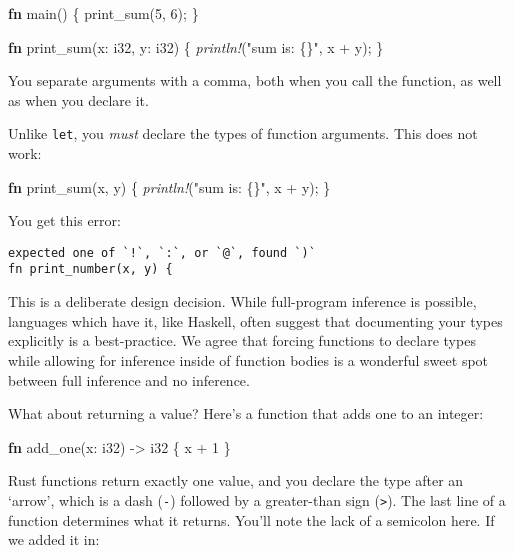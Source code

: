 \documentclass[a4paper,]{book}
\newenvironment{Shaded}{\begin{snugshade}}{\end{snugshade}}
\newcommand{\KeywordTok}[1]{\textcolor[rgb]{0.13,0.29,0.53}{\textbf{{#1}}}}
\newcommand{\DataTypeTok}[1]{\textcolor[rgb]{0.13,0.29,0.53}{{#1}}}
\newcommand{\DecValTok}[1]{\textcolor[rgb]{0.00,0.00,0.81}{{#1}}}
\newcommand{\StringTok}[1]{\textcolor[rgb]{0.31,0.60,0.02}{{#1}}}
\newcommand{\PreprocessorTok}[1]{\textcolor[rgb]{0.56,0.35,0.01}{\textit{{#1}}}}
\newcommand{\NormalTok}[1]{{#1}}
\begin{document}
\begin{Shaded}
\begin{Highlighting}[]
\KeywordTok{fn} \NormalTok{main() \{}
    \NormalTok{print_sum(}\DecValTok{5}\NormalTok{, }\DecValTok{6}\NormalTok{);}
\NormalTok{\}}

\KeywordTok{fn} \NormalTok{print_sum(x: }\DataTypeTok{i32}\NormalTok{, y: }\DataTypeTok{i32}\NormalTok{) \{}
    \PreprocessorTok{println!}\NormalTok{(}\StringTok{"sum is: \{\}"}\NormalTok{, x + y);}
\NormalTok{\}}
\end{Highlighting}
\end{Shaded}

You separate arguments with a comma, both when you call the function, as
well as when you declare it.

Unlike \texttt{let}, you \emph{must} declare the types of function
arguments. This does not work:

\begin{Shaded}
\begin{Highlighting}[]
\KeywordTok{fn} \NormalTok{print_sum(x, y) \{}
    \PreprocessorTok{println!}\NormalTok{(}\StringTok{"sum is: \{\}"}\NormalTok{, x + y);}
\NormalTok{\}}
\end{Highlighting}
\end{Shaded}

You get this error:

\begin{verbatim}
expected one of `!`, `:`, or `@`, found `)`
fn print_number(x, y) {
\end{verbatim}

This is a deliberate design decision. While full-program inference is
possible, languages which have it, like Haskell, often suggest that
documenting your types explicitly is a best-practice. We agree that
forcing functions to declare types while allowing for inference inside
of function bodies is a wonderful sweet spot between full inference and
no inference.

What about returning a value? Here's a function that adds one to an
integer:

\begin{Shaded}
\begin{Highlighting}[]
\KeywordTok{fn} \NormalTok{add_one(x: }\DataTypeTok{i32}\NormalTok{) -> }\DataTypeTok{i32} \NormalTok{\{}
    \NormalTok{x + }\DecValTok{1}
\NormalTok{\}}
\end{Highlighting}
\end{Shaded}

Rust functions return exactly one value, and you declare the type after
an `arrow', which is a dash (\texttt{-}) followed by a greater-than sign
(\texttt{\textgreater{}}). The last line of a function determines what
it returns. You'll note the lack of a semicolon here. If we added it in:
\end{document}
